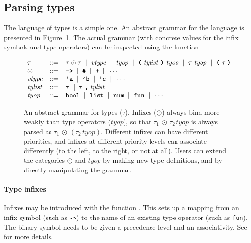 \subsection{Parsing types}

The language of types is a simple one.  An abstract grammar for the
language is presented in Figure~\ref{fig:abstract-type-grammar}.  The
actual grammar (with concrete values for the infix symbols and type
operators) can be inspected using the function .
\begin{figure}[tbhp]
\newcommand{\nt}[1]{\mathit{#1}}
\newcommand{\tok}[1]{\texttt{\bfseries #1}}
\renewcommand{\bar}{\;\;|\;\;}
\[
\begin{array}{lcl}
\tau &::=& \tau \odot \tau \bar \nt{vtype} \bar \nt{tyop} \bar
           \tok{(} \;\nt{tylist}\;\tok{)} \;\nt{tyop}\bar \tau \;\nt{tyop}
           \bar \tok{(}\;\tau\;\tok{)}\\
\odot &::=& \tok{->} \bar \tok{\#} \bar \tok{+} \bar \cdots\\
\nt{vtype} &::=& \tok{'a} \bar \tok{'b} \bar \tok{'c} \bar \cdots\\
\nt{tylist} &::=& \tau \bar \tau \;\tok{,}\;\nt{tylist}\\
\nt{tyop} &::=& \tok{bool} \bar \tok{list} \bar \tok{num} \bar
           \tok{fun} \bar \cdots
\end{array}
\]
\caption{An abstract grammar for \HOL{} types ($\tau$).  Infixes ($\odot$)
  always bind more weakly than type operators ($\nt{tyop}$), so that
  $\tau_1 \,\odot\, \tau_2 \,\nt{tyop}$ is always parsed as $\tau_1\, \odot\,
  (\tau_2 \,\nt{tyop})$.  Different infixes can have different
  priorities, and infixes at different priority levels can associate
  differently (to the left, to the right, or not at all).  Users can
  extend the categories $\odot$ and $\nt{tyop}$ by making new type
  definitions, and by directly manipulating the grammar.}
\label{fig:abstract-type-grammar}
\end{figure}

\paragraph{Type infixes}
Infixes may be introduced with the function .
This sets up a mapping from an infix symbol (such as \texttt{->}) to
the name of an existing type operator (such as \texttt{fun}).  The
binary symbol needs to be given a precedence level and an
associativity. See \REFERENCE{} for more details.

